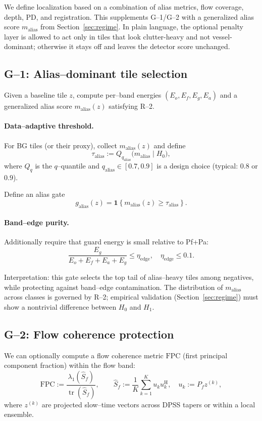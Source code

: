 \documentclass[11pt]{article}
\newcommand{\wh}{\widehat}
\newcommand{\Hh}{^{\mathrm{H}}}
\newcommand{\tr}{\operatorname{tr}}
\newcommand{\Pf}{P_f}
\begin{document}
We define localization based on a combination of alias metrics, flow coverage, depth, PD, and registration. This supplements G--1/G--2 with a generalized alias score $m_{\mathrm{alias}}$ from Section~\ref{sec:regime}.
In plain language, the optional penalty layer is allowed to act only in tiles that look clutter-heavy and not vessel-dominant; otherwise it stays off and leaves the detector score unchanged.

\subsection{G--1: Alias--dominant tile selection}

Given a baseline tile $z$, compute per--band energies $(E_o,E_f,E_g,E_a)$ and a generalized alias score $m_{\mathrm{alias}}(z)$ satisfying R--2.

\paragraph{Data--adaptive threshold.}
For BG tiles (or their proxy), collect $m_{\mathrm{alias}}(z)$ and define
\[
\tau_{\mathrm{alias}} := Q_{q_{\mathrm{alias}}}\bigl(m_{\mathrm{alias}} \mid H_0\bigr),
\]
where $Q_q$ is the $q$--quantile and $q_{\mathrm{alias}}\in[0.7,0.9]$ is a design choice (typical: $0.8$ or $0.9$).

Define an alias gate
\[
g_{\mathrm{alias}}(z) = \mathbf{1}\left\{ m_{\mathrm{alias}}(z) \ge \tau_{\mathrm{alias}} \right\}.
\]

\paragraph{Band--edge purity.}
Additionally require that guard energy is small relative to Pf+Pa:
\[
\frac{E_g}{E_o + E_f + E_a + E_g} \le \eta_{\text{edge}},\quad
\eta_{\text{edge}}\le 0.1.
\]

Interpretation: this gate selects the top tail of alias--heavy tiles among negatives, while protecting against band--edge contamination. The distribution of $m_{\mathrm{alias}}$ across classes is governed by R--2; empirical validation (Section~\ref{sec:regime}) must show a nontrivial difference between $H_0$ and $H_1$.

\subsection{G--2: Flow coherence protection}

We can optionally compute a flow coherence metric $\mathrm{FPC}$ (first principal component fraction) within the flow band:
\[
\mathrm{FPC} := \frac{\lambda_1(\wh S_f)}{\tr(\wh S_f)},\qquad
\wh S_f := \frac{1}{K}\sum_{k=1}^K u_k u_k\Hh,\quad
u_k := \Pf z^{(k)},
\]
where $z^{(k)}$ are projected slow--time vectors across DPSS tapers or within a local ensemble.
\end{document}
